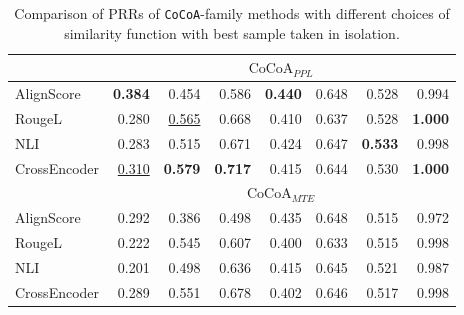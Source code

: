 \begin{table*}[h!]
\begin{tabular}{lrrrrrrr}
\midrule

& \multicolumn{7}{c}{$\text{CoCoA}_{PPL}$}\\
\midrule

AlignScore & \textbf{0.384}& 0.454& 0.586& \textbf{0.440}& 0.648& 0.528& 0.994\\
RougeL & 0.280& \underline{0.565}& 0.668& 0.410& 0.637& 0.528& \textbf{1.000}\\
NLI & 0.283& 0.515& 0.671& 0.424& 0.647& \textbf{0.533}& 0.998\\
CrossEncoder & \underline{0.310}& \textbf{0.579}& \textbf{0.717}& 0.415& 0.644& 0.530& \textbf{1.000}\\

\midrule

& \multicolumn{7}{c}{$\text{CoCoA}_{MTE}$}\\
\midrule

AlignScore & 0.292& 0.386& 0.498& 0.435& 0.648& 0.515& 0.972\\
RougeL & 0.222& 0.545& 0.607& 0.400& 0.633& 0.515& 0.998\\
NLI & 0.201& 0.498& 0.636& 0.415& 0.645& 0.521& 0.987\\
CrossEncoder & 0.289& 0.551& 0.678& 0.402& 0.646& 0.517& 0.998\\
\bottomrule

\end{tabular}

\caption{Comparison of PRRs of \texttt{CoCoA}-family methods with different choices of similarity function with best sample taken in isolation.}
\label{suppl:ablation_sim_mat_best}
\end{table*}
